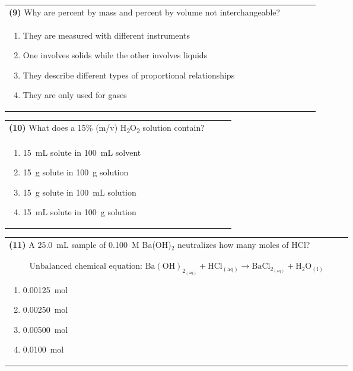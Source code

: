 \documentclass{article}
\begin{document}
\noindent\begin{tabular}{|p{0.9\linewidth}|}
\hline
\textbf{(9)} Why are percent by mass and percent by volume not interchangeable?\\[0.2cm]
\begin{minipage}[t]{0.85\linewidth}
\begin{enumerate}[label=\alph*.]
\item They are measured with different instruments
\item One involves solids while the other involves liquids
\item They describe different types of proportional relationships
\item They are only used for gases
\end{enumerate}
\end{minipage}\\[0.2cm]
\hline
\end{tabular}

\noindent\begin{tabular}{|p{0.9\linewidth}|}
\hline
\textbf{(10)} What does a 15\% (m/v) H\textsubscript{2}O\textsubscript{2} solution contain?\\[0.2cm]
\begin{minipage}[t]{0.85\linewidth}
\begin{enumerate}[label=\alph*.]
\item 15~mL solute in 100~mL solvent
\item 15~g solute in 100~g solution
\item 15~g solute in 100~mL solution
\item 15~mL solute in 100~g solution
\end{enumerate}
\end{minipage}\\[0.2cm]
\hline
\end{tabular}

\noindent\begin{tabular}{|p{0.9\linewidth}|}
\hline
\textbf{(11)} A 25.0~mL sample of 0.100~M Ba(OH)$_2$ neutralizes how many moles of HCl?\\[0.2cm]
\[
\text{Unbalanced chemical equation: } \mathrm{Ba(OH)_2_{(aq)} + HCl_{(aq)} \rightarrow BaCl_2_{(aq)} + H_2O_{(l)}}
\]
\begin{minipage}[t]{0.85\linewidth}
\begin{enumerate}[label=\alph*.]
\item 0.00125~mol
\item 0.00250~mol
\item 0.00500~mol
\item 0.0100~mol
\end{enumerate}
\end{minipage}\\[0.2cm]
\hline
\end{tabular}
\end{document}

